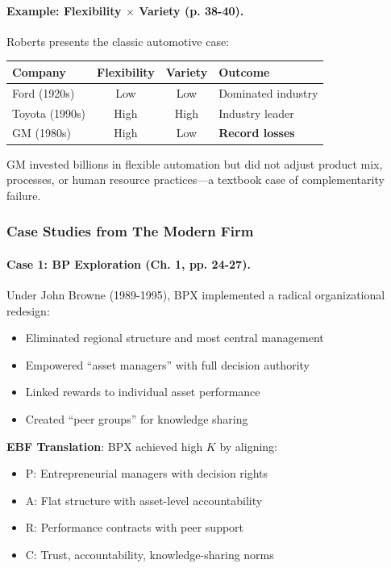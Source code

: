 \paragraph{Example: Flexibility $\times$ Variety (p. 38-40).}
Roberts presents the classic automotive case:

\begin{center}
\renewcommand{\arraystretch}{1.4}
\begin{tabular}{|l|c|c|l|}
\hline
\textbf{Company} & \textbf{Flexibility} & \textbf{Variety} & \textbf{Outcome} \\
\hline
Ford (1920s) & Low & Low & Dominated industry \\
Toyota (1990s) & High & High & Industry leader \\
GM (1980s) & High & Low & \textbf{Record losses} \\
\hline
\end{tabular}
\end{center}

GM invested billions in flexible automation but did not adjust product mix, 
processes, or human resource practices---a textbook case of complementarity failure.

\subsubsection{Case Studies from The Modern Firm}

\paragraph{Case 1: BP Exploration (Ch. 1, pp. 24-27).}
Under John Browne (1989-1995), BPX implemented a radical organizational redesign:
\begin{itemize}
    \item Eliminated regional structure and most central management
    \item Empowered ``asset managers'' with full decision authority
    \item Linked rewards to individual asset performance
    \item Created ``peer groups'' for knowledge sharing
\end{itemize}

\textbf{EBF Translation}: BPX achieved high $K$ by aligning:
\begin{itemize}
    \item P: Entrepreneurial managers with decision rights
    \item A: Flat structure with asset-level accountability
    \item R: Performance contracts with peer support
    \item C: Trust, accountability, knowledge-sharing norms
\end{itemize}

